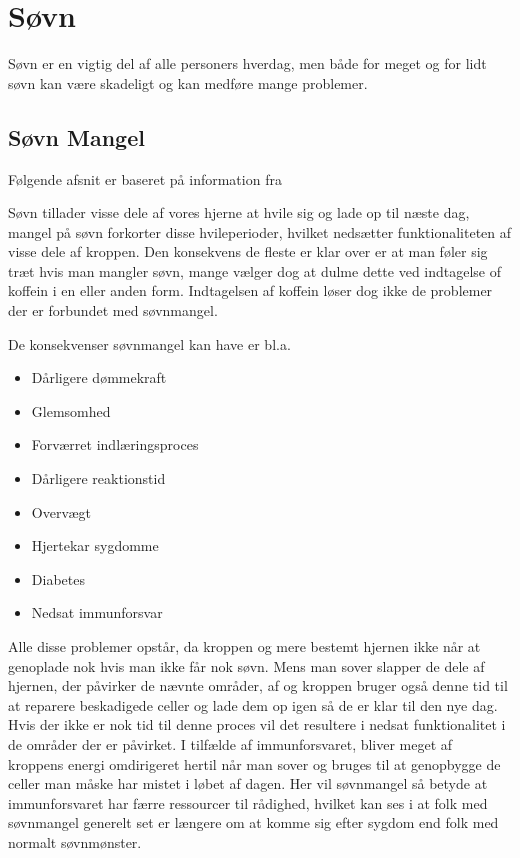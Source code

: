 \section{Søvn}
Søvn er en vigtig del af alle personers hverdag, men både for meget og for lidt søvn kan være skadeligt og kan medføre mange problemer.

\subsection{Søvn Mangel}
Følgende afsnit er baseret på information fra \citep{misc:tenThings, misc:getSleep}

Søvn tillader visse dele af vores hjerne at hvile sig og lade op til næste dag, mangel på søvn forkorter disse hvileperioder, hvilket nedsætter funktionaliteten af visse dele af kroppen.
Den konsekvens de fleste er klar over er at man føler sig træt hvis man mangler søvn, mange vælger dog at dulme dette ved indtagelse of koffein i en eller anden form.
Indtagelsen af koffein løser dog ikke de problemer der er forbundet med søvnmangel. 

De konsekvenser søvnmangel kan have er bl.a.
\begin{itemize}
\item Dårligere dømmekraft
\item Glemsomhed
\item Forværret indlæringsproces
\item Dårligere reaktionstid
\item Overvægt
\item Hjertekar sygdomme
\item Diabetes
\item Nedsat immunforsvar
\end{itemize}

Alle disse problemer opstår, da kroppen og mere bestemt hjernen ikke når at genoplade nok hvis man ikke får nok søvn.
Mens man sover slapper de dele af hjernen, der påvirker de nævnte områder, af og kroppen bruger også denne tid til at reparere beskadigede celler og lade dem op igen så de er klar til den nye dag.
Hvis der ikke er nok tid til denne proces vil det resultere i nedsat funktionalitet i de områder der er påvirket.
I tilfælde af immunforsvaret, bliver meget af kroppens energi omdirigeret hertil når man sover og bruges til at genopbygge de celler man måske har mistet i løbet af dagen.
Her vil søvnmangel så betyde at immunforsvaret har færre ressourcer til rådighed, hvilket kan ses i at folk med søvnmangel generelt set er længere om at komme sig efter sygdom end folk med normalt søvnmønster.

